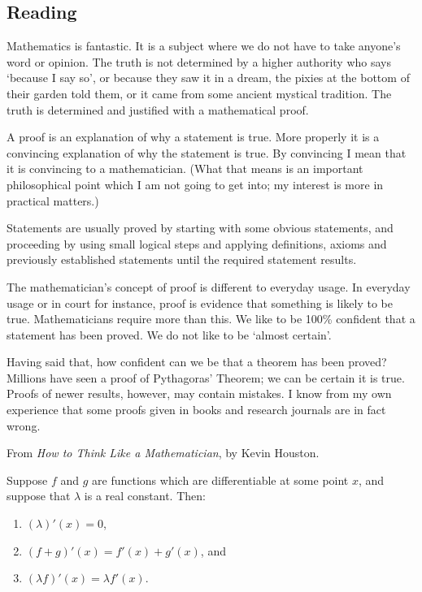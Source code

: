 


\subsection*{Reading}

Mathematics is fantastic. It is a subject where we do not have to take anyone’s word or
opinion. The truth is not determined by a higher authority who says ‘because I say so’,
or because they saw it in a dream, the pixies at the bottom of their garden told them, or
it came from some ancient mystical tradition. The truth is determined and justified with a
mathematical proof.

A proof is an explanation of why a statement is true. More properly it is a convincing
explanation of why the statement is true. By convincing I mean that it is convincing to
a mathematician. (What that means is an important philosophical point which I am not
going to get into; my interest is more in practical matters.)

Statements are usually proved by starting with some obvious statements, and proceeding
by using small logical steps and applying definitions, axioms and previously established
statements until the required statement results.

The mathematician’s concept of proof is different to everyday usage. In everyday usage
or in court for instance, proof is evidence that something is likely to be true. Mathematicians
require more than this. We like to be 100\% confident that a statement has been proved.
We do not like to be ‘almost certain’.

Having said that, how confident can we be that a theorem has been proved? Millions
have seen a proof of Pythagoras’ Theorem; we can be certain it is true. Proofs of newer
results, however, may contain mistakes. I know from my own experience that some proofs
given in books and research journals are in fact wrong.

\begin{flushright}
  From \textit{How to Think Like a Mathematician}, by Kevin Houston.
\end{flushright}

\begin{thm}
  Suppose $ f $ and $ g $ are functions which are differentiable at some point $ x $, and
  suppose that $ \lambda $ is a real constant. Then:
  \begin{enumerate}
    \item $ (\lambda)'(x) = 0 $,
    \item $ (f + g)'(x) = f'(x) + g'(x) $, and
    \item $ (\lambda f)'(x) = \lambda f'(x) $.
  \end{enumerate}
\end{thm}

